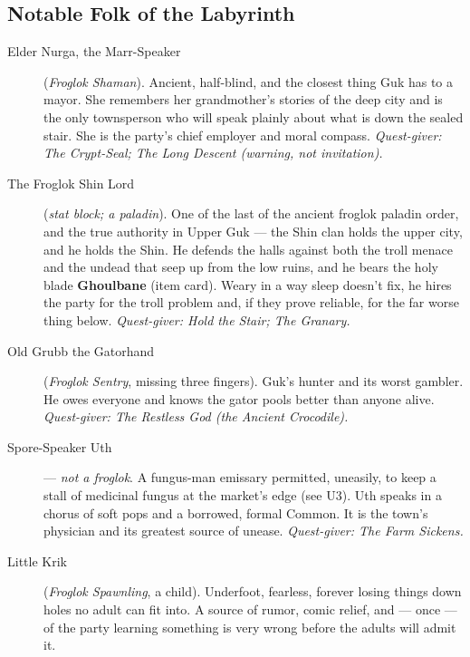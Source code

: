 \documentclass[10pt,twoside]{report}
\begin{document}
\subsection*{Notable Folk of the Labyrinth}
\begin{description}
\item[Elder Nurga, the Marr-Speaker] (\emph{Froglok Shaman}). Ancient, half-blind, and the closest thing Guk has to a mayor. She remembers her grandmother's stories of the deep city and is the only townsperson who will speak plainly about what is down the sealed stair. She is the party's chief employer and moral compass. \emph{Quest-giver: The Crypt-Seal; The Long Descent (warning, not invitation).}
\item[The Froglok Shin Lord] (\emph{stat block; a paladin}). One of the last of the ancient froglok paladin order, and the true authority in Upper Guk --- the Shin clan holds the upper city, and he holds the Shin. He defends the halls against both the troll menace and the undead that seep up from the low ruins, and he bears the holy blade \textbf{Ghoulbane} (item card). Weary in a way sleep doesn't fix, he hires the party for the troll problem and, if they prove reliable, for the far worse thing below. \emph{Quest-giver: Hold the Stair; The Granary.}
\item[Old Grubb the Gatorhand] (\emph{Froglok Sentry}, missing three fingers). Guk's hunter and its worst gambler. He owes everyone and knows the gator pools better than anyone alive. \emph{Quest-giver: The Restless God (the Ancient Crocodile).}
\item[Spore-Speaker Uth] --- \emph{not a froglok}. A fungus-man emissary permitted, uneasily, to keep a stall of medicinal fungus at the market's edge (see U3). Uth speaks in a chorus of soft pops and a borrowed, formal Common. It is the town's physician and its greatest source of unease. \emph{Quest-giver: The Farm Sickens.}
\item[Little Krik] (\emph{Froglok Spawnling}, a child). Underfoot, fearless, forever losing things down holes no adult can fit into. A source of rumor, comic relief, and --- once --- of the party learning something is very wrong before the adults will admit it.
\end{description}
\end{document}
